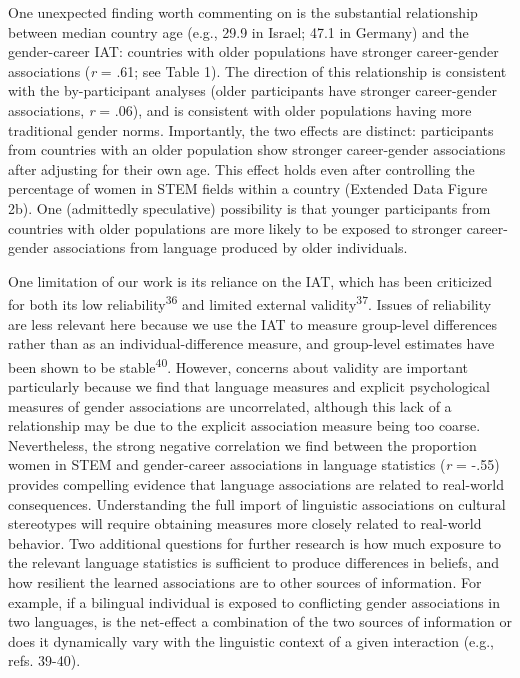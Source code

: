 \documentclass[11pt]{wlscirep}
\begin{document}
One unexpected finding worth commenting on is the substantial relationship between median country age (e.g., 29.9 in Israel; 47.1 in Germany) and the gender-career IAT: countries with older populations have stronger career-gender associations (\emph{r} = .61; see Table 1). The direction of this relationship is consistent with the by-participant analyses (older participants have stronger career-gender associations, \emph{r} = .06), and is consistent with older populations having more traditional gender norms. Importantly, the two effects are distinct: participants from countries with an older population show stronger career-gender associations after adjusting for their own age. This effect holds even after controlling the percentage of women in STEM fields within a country (Extended Data Figure 2b). One (admittedly speculative) possibility is that younger participants from countries with older populations are more likely to be exposed to stronger career-gender associations from language produced by older individuals.  



One limitation of our work is its reliance on the IAT, which has been criticized for both its low reliability\textsuperscript{36} and limited external validity\textsuperscript{37}. Issues of reliability are less relevant here because we use the IAT to measure group-level differences rather than as an individual-difference measure, and group-level estimates have been shown to be stable\textsuperscript{40}. However, concerns about validity are important particularly because we find that language measures and explicit psychological measures of gender associations are uncorrelated, although this lack of a relationship may be due to the explicit association measure being too coarse. Nevertheless, the strong negative correlation we find between the proportion women in STEM and gender-career associations in language statistics (\emph{r} = -.55) provides compelling evidence that language associations are related to real-world consequences. Understanding the full import of linguistic associations on cultural stereotypes will require obtaining measures more closely related to real-world behavior. Two additional questions for further research is how much exposure to the relevant language statistics is sufficient to produce differences in beliefs, and how resilient the learned associations are to other sources of information. For example, if a bilingual individual is exposed to conflicting gender associations in two languages, is the net-effect a combination of the two sources of information or does it dynamically vary with the linguistic context of a given interaction (e.g., refs. 39-40).
\end{document}
